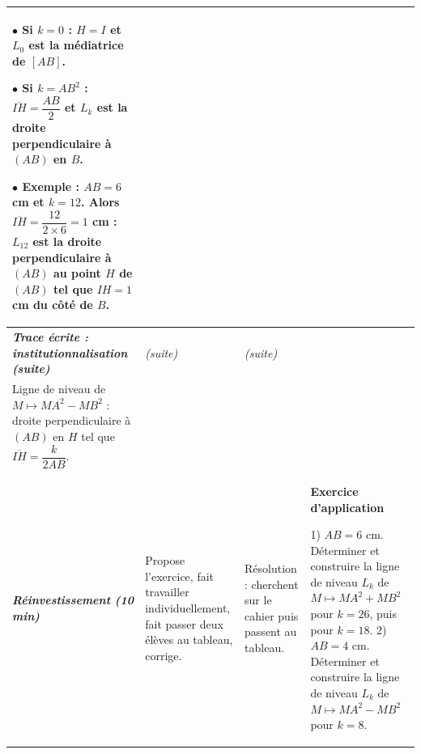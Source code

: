 \documentclass[10pt,a4paper,landscape]{article}
\newcommand{\bleu}[1]{{\color{cBleu}\bfseries #1}}                        %
\newcommand{\moment}[1]{\textbf{\itshape #1}}                             %
\begin{document}
{\begin{longtable}{|J{2.12cm}|L{5.17cm}|L{4.37cm}|L{13.64cm}|}
$\bullet$ Si $k=0$ : $H=I$ et $L_0$ est la \textbf{médiatrice} de $[AB]$.\par
$\bullet$ Si $k=AB^2$ : $\overline{IH}=\dfrac{AB}{2}$ et $L_k$ est la droite perpendiculaire à $(AB)$ en $B$.\par
$\bullet$ \textbf{Exemple :} $AB=6$ cm et $k=12$. Alors $\overline{IH}=\dfrac{12}{2\times 6}=1$ cm : $L_{12}$
est la droite perpendiculaire à $(AB)$ au point $H$ de $(AB)$ tel que $IH=1$ cm du côté de $B$.
\\
\hline
\moment{Trace écrite : institutionnalisation (suite)} &
\par{\centering\itshape (suite)\par} &
\par{\centering\itshape (suite)\par} &

\par\smallskip\par{\centering
{}\\[2pt]{\footnotesize Ligne de niveau de $M\mapsto MA^2-MB^2$ : droite perpendiculaire à $(AB)$ en $H$ tel que
$\overline{IH}=\dfrac{k}{2AB}$.}
\par}\par\smallskip
\\
\hline
\moment{Ré\-in\-ves\-tis\-se\-ment (10 min)} &
Propose l'exercice, fait travailler individuellement, fait passer deux élèves au tableau, corrige. &
Résolution : cherchent sur le cahier puis passent au tableau. &
\bleu{Exercice d'application}

1) $AB=6$ cm. Déterminer et construire la ligne de niveau $L_k$ de $M\mapsto MA^2+MB^2$ pour $k=26$, puis pour $k=18$.
2) $AB=4$ cm. Déterminer et construire la ligne de niveau $L_k$ de $M\mapsto MA^2-MB^2$ pour $k=8$.


\end{longtable}}
\end{document}

